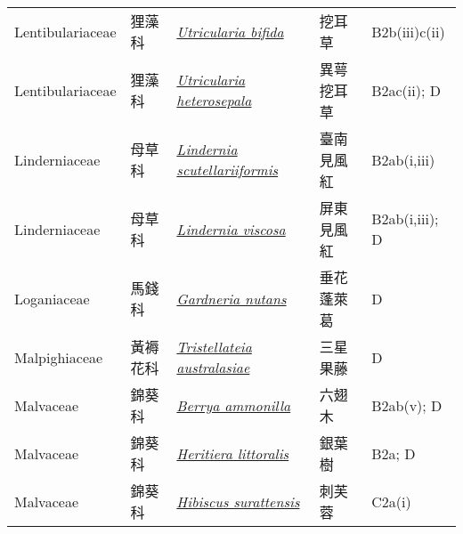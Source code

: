 {\begin{longtable}{L{2.5cm}L{2cm}L{5cm}L{2.5cm}L{3cm}}
    Lentibulariaceae & 狸藻科 & \href{http://www.theplantlist.org/tpl1.1/search?q=Utricularia+bifida}{\textit{Utricularia bifida} } & 挖耳草 & B2b(iii)c(ii)    \\
    Lentibulariaceae & 狸藻科 & \href{http://www.theplantlist.org/tpl1.1/search?q=Utricularia+heterosepala}{\textit{Utricularia heterosepala} } & 異萼挖耳草 & B2ac(ii); D    \\
    Linderniaceae & 母草科 & \href{http://www.theplantlist.org/tpl1.1/search?q=Lindernia+scutellariiformis}{\textit{Lindernia scutellariiformis} } & 臺南見風紅 & B2ab(i,iii)    \\
    Linderniaceae & 母草科 & \href{http://www.theplantlist.org/tpl1.1/search?q=Lindernia+viscosa}{\textit{Lindernia viscosa} } & 屏東見風紅 & B2ab(i,iii); D    \\
    Loganiaceae & 馬錢科 & \href{http://www.theplantlist.org/tpl1.1/search?q=Gardneria+nutans}{\textit{Gardneria nutans} } & 垂花蓬萊葛 & D    \\
    Malpighiaceae & 黃褥花科 & \href{http://www.theplantlist.org/tpl1.1/search?q=Tristellateia+australasiae}{\textit{Tristellateia australasiae} } & 三星果藤 & D    \\
    Malvaceae & 錦葵科 & \href{http://www.theplantlist.org/tpl1.1/search?q=Berrya+ammonilla}{\textit{Berrya ammonilla} } & 六翅木 & B2ab(v); D    \\
    Malvaceae & 錦葵科 & \href{http://www.theplantlist.org/tpl1.1/search?q=Heritiera+littoralis}{\textit{Heritiera littoralis} } & 銀葉樹 & B2a; D    \\
    Malvaceae & 錦葵科 & \href{http://www.theplantlist.org/tpl1.1/search?q=Hibiscus+surattensis}{\textit{Hibiscus surattensis} } & 刺芙蓉 & C2a(i)    \\

\end{longtable}}
